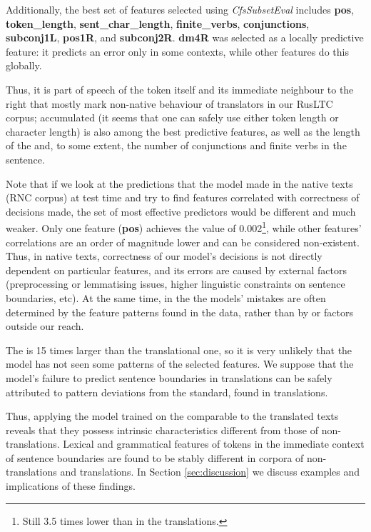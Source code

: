 \documentclass[output=paper]{langsci/langscibook.cls}
\begin{document}
Additionally, the best set of features selected using \textit{CfsSubsetEval} includes \textbf{pos}, \textbf{token\_length}, \textbf{sent\_char\_length}, \textbf{finite\_verbs}, \textbf{conjunctions}, \textbf{subconj1L}, \textbf{pos1R}, and \textbf{subconj2R}. \textbf{dm4R} was selected as a locally predictive feature: it predicts an error only in some contexts, while other features do this globally.

Thus, it is part of speech of the token itself and its immediate neighbour to the right that mostly mark non-native behaviour of  translators in our RusLTC corpus; accumulated  (it seems that one can safely use either token length or character length) is also among the best predictive features, as well as the length of the  and, to some extent, the number of conjunctions and finite verbs in the sentence.

Note that if we look at the predictions that the model made in the native texts (RNC corpus) at test time and try to find features correlated with correctness of decisions made, the set of most effective predictors would be different and much weaker. Only one feature (\textbf{pos}) achieves the  value of 0.002\footnote{Still 3.5 times lower than in the translations.}, while other features' correlations are an order of magnitude lower and can be considered non-existent. Thus, in native texts, correctness of our model's decisions is not directly dependent on particular features, and its errors are caused by external factors (preprocessing or lemmatising issues, higher linguistic constraints on sentence boundaries, etc). At the same time, in the  the models' mistakes are often determined by the feature patterns found in the data, rather than by  or factors outside our reach. 

The  is 15 times larger than the translational one, so it is very unlikely that the model has not seen some patterns of the selected features. We suppose that the model's failure to predict sentence boundaries in translations can be safely attributed to  pattern deviations from the standard, found in translations.

Thus, applying the model trained on the comparable  to the translated texts reveals that they possess intrinsic characteristics different from those of non-translations. Lexical and grammatical features of tokens in the immediate context of sentence boundaries are found to be stably different in corpora of non-translations and translations. In Section \ref{sec:discussion} we discuss examples and implications of these findings.
\end{document}
